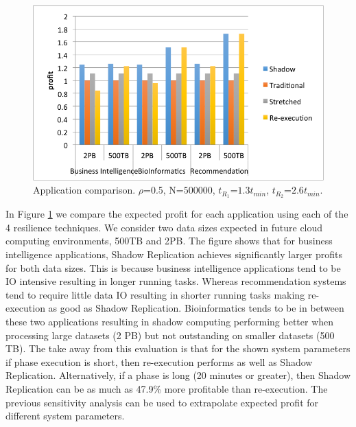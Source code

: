 \begin{figure}[!h]
	
	\begin{center}
	\includegraphics[width=\columnwidth]{diagrams/application_comparison.png}
	\end{center}
	\caption{Application comparison. $\rho$=0.5, N=$500000$, $t_{R_1}$=$1.3t_{min}$, $t_{R_2}$=$2.6t_{min}$.}
	\label{fig:app_compare}
\end{figure}


In Figure \ref{fig:app_compare} we compare the expected
profit for each application using each of the 4 resilience techniques. 
We consider two data sizes expected in future
cloud computing environments, 500TB and 2PB. The figure shows that
for business intelligence applications, Shadow Replication achieves significantly larger profits for both data sizes. This
is because business intelligence applications tend to be IO intensive
resulting in longer running tasks. Whereas recommendation systems tend
to require little data IO resulting in shorter running tasks making
re-execution as good as Shadow Replication. Bioinformatics tends to be in between
these two applications resulting in shadow computing performing better
when processing large datasets (2 PB) but not outstanding on smaller
datasets (500 TB). The take away from this evaluation is that for the
shown system parameters if phase execution is short, then re-execution
performs as well as Shadow Replication. Alternatively, if a phase is long (20 minutes or
greater), then Shadow Replication can be as much as 47.9\% more
profitable than re-execution. The previous sensitivity analysis can be
used to extrapolate expected profit for different system parameters.





